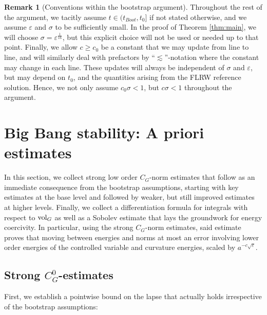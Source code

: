 \documentclass[11pt,leqno,textwidth=10cm]{amsart}
\numberwithin{equation}{section}
\theoremstyle{definition}
\newtheorem{remark}[definition]{Remark}
\theoremstyle{plain}
\newcommand{\1}{\mathbbm{1}}
\newcommand{\vol}[1]{{\text{\normalfont{vol}}}_{#1}}
\renewcommand{\epsilon}{\varepsilon}
\begin{document}
\begin{remark}[Conventions within the bootstrap argument]
Throughout the rest of the argument, we tacitly assume $t\in(t_{Boot},t_0]$ if not stated otherwise, and we assume $\epsilon$ and $\sigma$ to be sufficiently small. In the proof of Theorem \ref{thm:main}, we will choose $\sigma=\epsilon^\frac1{16}$, but this explicit choice will not be used or needed up to that point. Finally, %
we allow $c\geq c_0$ be a constant that we may update from line to line, and will similarly deal with prefactors by \enquote{$\lesssim$}-notation where the constant may change in each line. These updates will always be independent of $\sigma$ and $\epsilon$, but may depend on $t_0$, and the quantities arising from the FLRW reference solution. Hence, we not only assume $c_0\sigma<1$, but $c\sigma<1$ throughout the argument.
\end{remark}

\section{Big Bang stability: A priori estimates}\label{sec:ap}

In this section, we collect strong low order $C_G$-norm estimates that follow as an immediate consequence from the bootstrap assumptions, starting with key estimates at the base level and followed by weaker, but still improved estimates at higher levels. Finally, we collect a differentiation formula for integrals with respect to $\vol{G}$ as well as a Sobolev estimate that lays the groundwork for energy coercivity. In particular, using the strong $C_G$-norm estimates, said estimate proves that moving between energies and norms at most an error involving lower order energies of the controlled variable and curvature energies, scaled by $a^{-c\sqrt{\epsilon}}$.

\subsection{Strong $C^0_G$-estimates}\label{subsec:APlow}

First, we establish a pointwise bound on the lapse that actually holds irrespective of the bootstrap assumptions:
\end{document}
